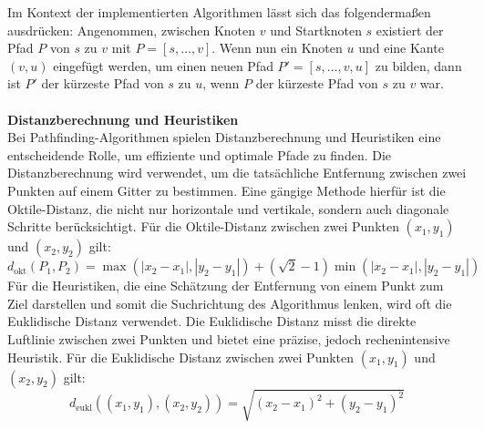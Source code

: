 Im Kontext der implementierten Algorithmen lässt sich das folgendermaßen ausdrücken:
Angenommen, zwischen Knoten $v$ und Startknoten $s$ existiert der Pfad $P$ von $s$ zu $v$ mit $P = [s, \dots, v]$.
Wenn nun ein Knoten $u$ und eine Kante $(v, u)$ eingefügt werden, um einen neuen Pfad $P' = [s, \dots, v, u]$ zu
bilden, dann ist $P'$ der kürzeste Pfad von $s$ zu $u$, wenn $P$ der kürzeste Pfad von $s$ zu $v$ war. \\\\

\textbf{Distanzberechnung und Heuristiken}\\
Bei Pathfinding-Algorithmen spielen Distanzberechnung und Heuristiken eine entscheidende Rolle, um effiziente und optimale Pfade zu finden.
Die Distanzberechnung wird verwendet, um die tatsächliche Entfernung zwischen zwei Punkten auf einem Gitter zu bestimmen.
Eine gängige Methode hierfür ist die Oktile-Distanz, die nicht nur horizontale und vertikale, sondern auch diagonale Schritte berücksichtigt.
Für die Oktile-Distanz zwischen zwei Punkten $(x_1, y_1)$ und $(x_2, y_2)$ gilt:
\begin{equation}
    \label{eq:distance_octile}
    d_\text{okt}(P_1, P_2) = \max(|x_2 - x_1|, |y_2 - y_1|) + ( \sqrt{2} - 1) \min(|x_2 - x_1|, |y_2 - y_1|)
\end{equation}
Für die Heuristiken, die eine Schätzung der Entfernung von einem Punkt zum Ziel darstellen und somit die Suchrichtung
des Algorithmus lenken, wird oft die Euklidische Distanz verwendet.
Die Euklidische Distanz misst die direkte Luftlinie zwischen zwei Punkten und bietet eine präzise, jedoch rechenintensive Heuristik.
Für die Euklidische Distanz zwischen zwei Punkten $(x_1, y_1)$ und $(x_2, y_2)$ gilt:
\begin{equation}
    \label{eq:distance_euklid}
    d_\text{eukl}((x_1, y_1), (x_2, y_2)) = \sqrt{(x_2 - x_1)^2 + (y_2 - y_1)^2}
\end{equation}

